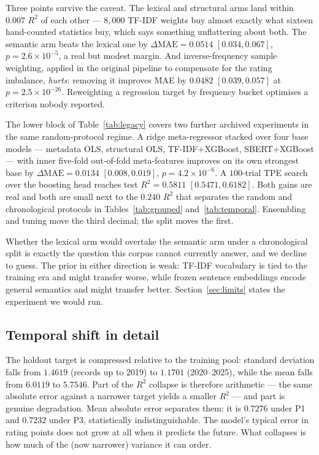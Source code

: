 \documentclass[conference,a4paper]{IEEEtran}
\begin{document}
Three points survive the caveat. The lexical and structural arms land
within $0.007$ $R^{2}$ of each other --- $8{,}000$ TF-IDF weights buy
almost exactly what sixteen hand-counted statistics buy, which says
something unflattering about both. The semantic arm beats the lexical one
by $\Delta\mathrm{MAE} = 0.0514$ $[0.034, 0.067]$,
$p = 2.6\times10^{-5}$, a real but modest margin. And inverse-frequency
sample weighting, applied in the original pipeline to compensate for the
rating imbalance, \emph{hurts}: removing it improves MAE by $0.0482$
$[0.039, 0.057]$ at $p = 2.5\times10^{-26}$. Reweighting a regression
target by frequency bucket optimises a criterion nobody reported.

The lower block of Table~\ref{tab:legacy} covers two further archived
experiments in the same random-protocol regime. A ridge meta-regressor
stacked over four base models --- metadata OLS, structural OLS,
TF-IDF+XGBoost, SBERT+XGBoost --- with inner five-fold out-of-fold
meta-features improves on its own strongest base by
$\Delta\mathrm{MAE} = 0.0134$ $[0.008, 0.019]$,
$p = 4.2\times10^{-6}$. A $100$-trial TPE search over the boosting head
reaches test $R^{2} = 0.5811$ $[0.5471, 0.6182]$. Both gains are real and
both are small next to the $0.240$ $R^{2}$ that separates the random and
chronological protocols in Tables~\ref{tab:grouped} and~\ref{tab:temporal}.
Ensembling and tuning move the third decimal; the split moves the first.

Whether the lexical arm would overtake the semantic arm under a
chronological split is exactly the question this corpus cannot currently
answer, and we decline to guess. The prior in either direction is weak:
TF-IDF vocabulary is tied to the training era and might transfer worse,
while frozen sentence embeddings encode general semantics and might
transfer better. Section~\ref{sec:limits} states the experiment we would
run.

\subsection{Temporal shift in detail}

The holdout target is compressed relative to the training pool: standard
deviation falls from $1.4619$ (records up to 2019) to $1.1701$
(2020--2025), while the mean falls from $6.0119$ to $5.7546$. Part of the
$R^{2}$ collapse is therefore arithmetic --- the same absolute error
against a narrower target yields a smaller $R^{2}$ --- and part is
genuine degradation. Mean absolute error separates them: it is $0.7276$
under P1 and $0.7232$ under P3, statistically indistinguishable. The
model's typical error in rating points does not grow at all when it
predicts the future. What collapses is how much of the (now narrower)
variance it can order.
\end{document}
